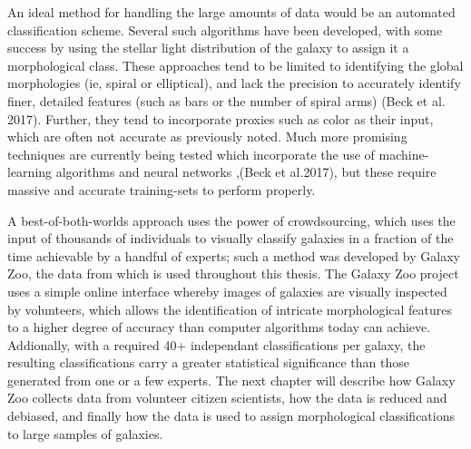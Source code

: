 An ideal method for handling the large amounts of data would be an automated classification scheme. Several such algorithms have been developed, with some success \citep{Odewahn2002,Peng2002,Conselice2003} by using the stellar light distribution of the galaxy to assign it a morphological class. These approaches tend to be limited to identifying the global morphologies (ie, spiral or elliptical), and lack the precision to accurately identify finer, detailed features (such as bars or the number of spiral arms) (Beck et al. 2017). Further, they tend to incorporate proxies such as color as their input, which are often not accurate as previously noted. Much more promising techniques are currently being tested which incorporate the use of machine-learning algorithms and neural networks \citep{Dieleman2015, Huertas-Company2015},(Beck et al.2017), but these require massive and accurate training-sets to perform properly. 

A best-of-both-worlds approach uses the power of crowdsourcing, which uses the input of thousands of individuals to visually classify galaxies in a fraction of the time achievable by a handful of experts; such a method was developed by Galaxy Zoo, the data from which is used throughout this thesis. The Galaxy Zoo project uses a simple online interface whereby images of galaxies are visually inspected by volunteers, which allows the identification of intricate morphological features to a higher degree of accuracy than computer algorithms today can achieve. Addionally, with a required 40+ independant classifications per galaxy, the resulting classifications carry a greater statistical significance than those generated from one or a few experts. The next chapter will describe how Galaxy Zoo collects data from volunteer citizen scientists, how the data is reduced and debiased, and finally how the data is used to assign morphological classifications to large samples of galaxies.  









